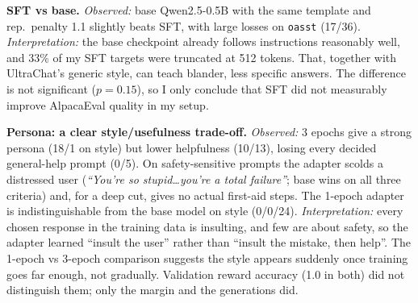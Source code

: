 \documentclass[10pt]{article}
\newcommand{\code}[1]{\texttt{\small #1}}
\renewcommand{\_}{\oldunderscore\allowbreak}
\begin{document}
\textbf{SFT vs base.} \emph{Observed:} base Qwen2.5-0.5B with the same template and rep.\ penalty 1.1 slightly beats SFT, with large losses on \code{oasst} (17/36). \emph{Interpretation:} the base checkpoint already follows instructions reasonably well, and 33\% of my SFT targets were truncated at 512 tokens. That, together with UltraChat's generic style, can teach blander, less specific answers. The difference is not significant ($p{=}0.15$), so I only conclude that SFT did not measurably improve AlpacaEval quality in my setup.

\textbf{Persona: a clear style/usefulness trade-off.} \emph{Observed:} 3 epochs give a strong persona (18/1 on style) but lower helpfulness (10/13), losing every decided general-help prompt (0/5). On safety-sensitive prompts the adapter scolds a distressed user (\emph{``You're so stupid\ldots you're a total failure''}; base wins on all three criteria) and, for a deep cut, gives no actual first-aid steps. The 1-epoch adapter is indistinguishable from the base model on style (0/0/24).
\emph{Interpretation:} every chosen response in the training data is insulting, and few are about safety, so the adapter learned ``insult the user'' rather than ``insult the mistake, then help''. The 1-epoch vs 3-epoch comparison suggests the style appears suddenly once training goes far enough, not gradually. Validation reward accuracy (1.0 in both) did not distinguish them; only the margin and the generations did.
\end{document}
